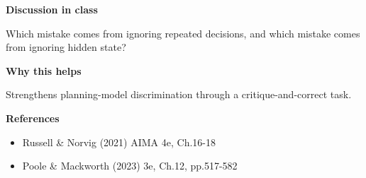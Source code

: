 \documentclass[11pt]{article}
\begin{document}
\begin{tcolorbox}[colback=white,colframe=MidnightBlue,title={Q6 Planning Model Choice},fonttitle=\bfseries,breakable]
{\large\bfseries\color{MidnightBlue} Discussion in class}\par\medskip
Which mistake comes from ignoring repeated decisions, and which mistake comes from ignoring hidden state?

{\large\bfseries\color{MidnightBlue} Why this helps}\par\medskip
Strengthens planning-model discrimination through a critique-and-correct task.

{\large\bfseries\color{MidnightBlue} References}\par\medskip
\begin{itemize}\item Russell \& Norvig (2021) AIMA 4e, Ch.16-18
\item Poole \& Mackworth (2023) 3e, Ch.12, pp.517-582\end{itemize}
\end{tcolorbox}
\end{document}
